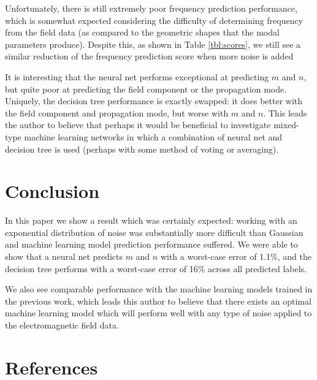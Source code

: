 \documentclass[conference]{IEEEtran}
\begin{document}
Unfortunately, there is still extremely poor frequency prediction performance, which is somewhat expected considering the difficulty of determining frequency from the field data (as compared to the geometric shapes that the modal parameters produce).
Despite this, as shown in Table \ref{tbl:scores}, we still see a similar reduction of the frequency prediction score when more noise is added

It is interesting that the neural net performs exceptional at predicting $m$ and $n$, but quite poor at predicting the field component or the propagation mode.
Uniquely, the decision tree performance is exactly swapped: it does better with the field component and propagation mode, but worse with $m$ and $n$. 
This leads the author to believe that perhaps it would be beneficial to investigate mixed-type machine learning networks in which a combination of neural net and decision tree is used (perhaps with some method of voting or averaging).

\section{Conclusion}

In this paper we show a result which was certainly expected: working with an exponential distribution of noise was substantially more difficult than Gaussian and machine learning model prediction performance suffered.
We were able to show that a neural net predicts $m$ and $n$ with a worst-case error of 1.1\%, and the decision tree performs with a worst-case error of 16\% across all predicted labels.

We also see comparable performance with the machine learning models trained in the previous work\cite{newberry_machine_2022-1}, which leads this author to believe that there exists an optimal machine learning model which will perform well with any type of noise applied to the electromagnetic field data.

\section*{References}


\end{document}
